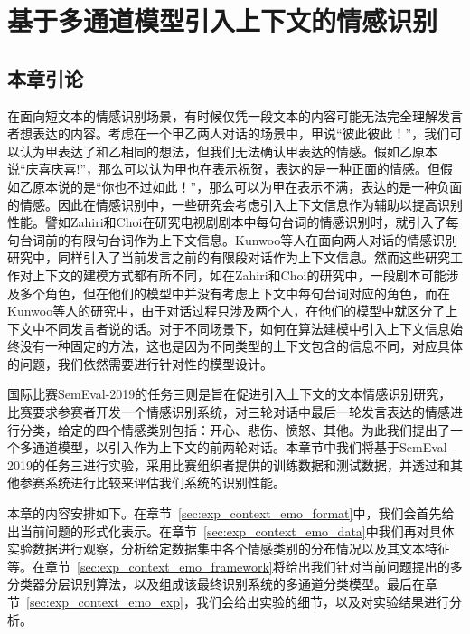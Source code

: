 \chapter{基于多通道模型引入上下文的情感识别}
\label{cha:exp_context_emo}

\section{本章引论}

在面向短文本的情感识别场景，有时候仅凭一段文本的内容可能无法完全理解发言者想表达的内容。考虑在一个甲乙两人对话的场景中，甲说“彼此彼此！”，我们可以认为甲表达了和乙相同的想法，但我们无法确认甲表达的情感。假如乙原本说“庆喜庆喜!”，那么可以认为甲也在表示祝贺，表达的是一种正面的情感。但假如乙原本说的是“你也不过如此！”，那么可以为甲在表示不满，表达的是一种负面的情感。因此在情感识别中，一些研究会考虑引入上下文信息作为辅助以提高识别性能。譬如Zahiri和Choi\cite{Zahiri2017Emotion}在研究电视剧剧本中每句台词的情感识别时，就引入了每句台词前的有限句台词作为上下文信息。Kunwoo等人\cite{hazarika2018conversational}在面向两人对话的情感识别研究中，同样引入了当前发言之前的有限段对话作为上下文信息。然而这些研究工作对上下文的建模方式都有所不同，如在Zahiri和Choi\cite{Zahiri2017Emotion}的研究中，一段剧本可能涉及多个角色，但在他们的模型中并没有考虑上下文中每句台词对应的角色，而在Kunwoo等人\cite{hazarika2018conversational}的研究中，由于对话过程只涉及两个人，在他们的模型中就区分了上下文中不同发言者说的话。对于不同场景下，如何在算法建模中引入上下文信息始终没有一种固定的方法，这也是因为不同类型的上下文包含的信息不同，对应具体的问题，我们依然需要进行针对性的模型设计。

国际比赛SemEval-2019的任务三\cite{SemEval2019Task3}则是旨在促进引入上下文的文本情感识别研究，比赛要求参赛者开发一个情感识别系统，对三轮对话中最后一轮发言表达的情感进行分类，给定的四个情感类别包括：开心、悲伤、愤怒、其他。为此我们提出了一个多通道模型，以引入作为上下文的前两轮对话。本章节中我们将基于SemEval-2019的任务三进行实验，采用比赛组织者提供的训练数据和测试数据，并透过和其他参赛系统进行比较来评估我们系统的识别性能。

本章的内容安排如下。在章节~\ref{sec:exp_context_emo_format}中，我们会首先给出当前问题的形式化表示。在章节~\ref{sec:exp_context_emo_data}中我们再对具体实验数据进行观察，分析给定数据集中各个情感类别的分布情况以及其文本特征等。在章节~\ref{sec:exp_context_emo_framework}将给出我们针对当前问题提出的多分类器分层识别算法，以及组成该最终识别系统的多通道分类模型。最后在章节~\ref{sec:exp_context_emo_exp}，我们会给出实验的细节，以及对实验结果进行分析。

